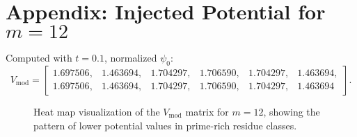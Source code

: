 \section*{Appendix: Injected Potential for \( m = 12 \)}
\vspace{5pt}
Computed with \( t = 0.1 \), normalized \( \psi_0 \):
\[
V_{\text{mod}} = \begin{bmatrix}
1.697506, & 1.463694, & 1.704297, & 1.706590, & 1.704297, & 1.463694, \\
1.697506, & 1.463694, & 1.704297, & 1.706590, & 1.704297, & 1.463694
\end{bmatrix}.
\]

\begin{figure}[h]
\centering
{}
\caption{Heat map visualization of the $V_{\text{mod}}$ matrix for $m=12$, showing the pattern of lower potential values in prime-rich residue classes.}
\label{fig:vmod_matrix}
\end{figure}